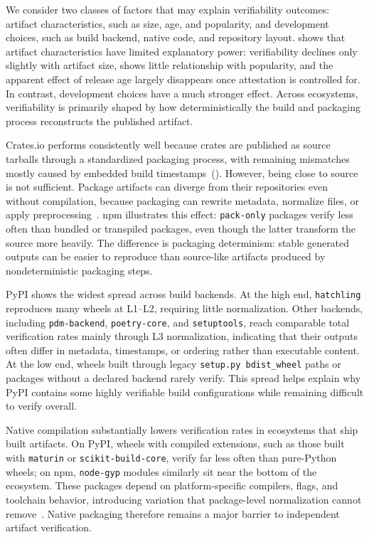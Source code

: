 We consider two classes of factors that may explain verifiability outcomes: artifact characteristics, such as size, age, and popularity, and development choices, such as build backend, native code, and repository layout.  shows that artifact characteristics have limited explanatory power: verifiability declines only slightly with artifact size, shows little relationship with popularity, and the apparent effect of release age largely disappears once attestation is controlled for. In contrast, development choices have a much stronger effect. Across ecosystems, verifiability is primarily shaped by how deterministically the build and packaging process reconstructs the published artifact.

Crates.io performs consistently well because crates are published as source tarballs through a standardized packaging process, with remaining mismatches mostly caused by embedded build timestamps~(). However, being close to source is not sufficient. Package artifacts can diverge from their repositories even without compilation, because packaging can rewrite metadata, normalize files, or apply preprocessing~\cite{vu_lastpymile_2021}. npm illustrates this effect: \texttt{pack-only} packages verify less often than bundled or transpiled packages, even though the latter transform the source more heavily. The difference is packaging determinism: stable generated outputs can be easier to reproduce than source-like artifacts produced by nondeterministic packaging steps.

PyPI shows the widest spread across build backends. At the high end, \texttt{hatchling} reproduces many wheels at L1--L2, requiring little normalization. Other backends, including \texttt{pdm-backend}, \texttt{poetry-core}, and \texttt{setuptools}, reach comparable total verification rates mainly through L3 normalization, indicating that their outputs often differ in metadata, timestamps, or ordering rather than executable content. At the low end, wheels built through legacy \texttt{setup.py bdist\_wheel} paths or packages without a declared backend rarely verify. This spread helps explain why PyPI contains some highly verifiable build configurations while remaining difficult to verify overall.

Native compilation substantially lowers verification rates in ecosystems that ship built artifacts. On PyPI, wheels with compiled extensions, such as those built with \texttt{maturin} or \texttt{scikit-build-core}, verify far less often than pure-Python wheels; on npm, \texttt{node-gyp} modules similarly sit near the bottom of the ecosystem. These packages depend on platform-specific compilers, flags, and toolchain behavior, introducing variation that package-level normalization cannot remove~\cite{malkaReproducibilityBuildEnvironments2024,randrianainaOptionsMatterDocumenting2024}. Native packaging therefore remains a major barrier to independent artifact verification.

